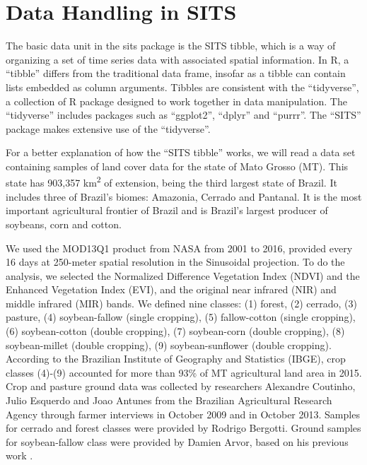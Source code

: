 \documentclass[article]{jss}
\begin{document}
\section{Data Handling in SITS}\label{data-handling-in-sits}

The basic data unit in the sits package is the SITS tibble, which is a
way of organizing a set of time series data with associated spatial
information. In R, a ``tibble'' differs from the traditional data frame,
insofar as a tibble can contain lists embedded as column arguments.
Tibbles are consistent with the ``tidyverse'', a collection of R package
designed to work together in data manipulation. The ``tidyverse''
includes packages such as ``ggplot2'', ``dplyr'' and ``purrr''. The
``SITS'' package makes extensive use of the ``tidyverse''.

For a better explanation of how the ``SITS tibble'' works, we will read
a data set containing samples of land cover data for the state of Mato
Grosso (MT). This state has 903,357 km\textsuperscript{2} of extension,
being the third largest state of Brazil. It includes three of Brazil's
biomes: Amazonia, Cerrado and Pantanal. It is the most important
agricultural frontier of Brazil and is Brazil's largest producer of
soybeans, corn and cotton.

We used the MOD13Q1 product from NASA from 2001 to 2016, provided every
16 days at 250-meter spatial resolution in the Sinusoidal projection. To
do the analysis, we selected the Normalized Difference Vegetation Index
(NDVI) and the Enhanced Vegetation Index (EVI), and the original near
infrared (NIR) and middle infrared (MIR) bands. We defined nine classes:
(1) forest, (2) cerrado, (3) pasture, (4) soybean-fallow (single
cropping), (5) fallow-cotton (single cropping), (6) soybean-cotton
(double cropping), (7) soybean-corn (double cropping), (8)
soybean-millet (double cropping), (9) soybean-sunflower (double
cropping). According to the Brazilian Institute of Geography and
Statistics (IBGE), crop classes (4)-(9) accounted for more than 93\% of
MT agricultural land area in 2015. Crop and pasture ground data was
collected by researchers Alexandre Coutinho, Julio Esquerdo and Joao
Antunes from the Brazilian Agricultural Research Agency through farmer
interviews in October 2009 and in October 2013. Samples for cerrado and
forest classes were provided by Rodrigo Bergotti. Ground samples for
soybean-fallow class were provided by Damien Arvor, based on his
previous work \citep{Arvor2012}.
\end{document}
